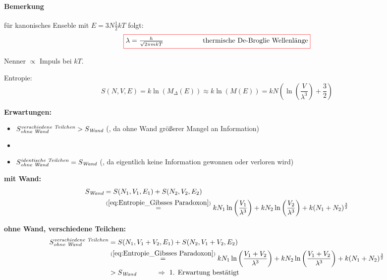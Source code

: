 \color{black!50!white}
\paragraph{Bemerkung} für kanonisches Enseble mit $E= 3N \frac{1}{2} k T$ folgt:
\begin{equation}
    \fcolorbox{red}{white}{$\lambda = \frac{h}{\sqrt{2 \pi mkT}} \hspace{2cm} \text{thermische De-Broglie Wellenlänge}$}
\end{equation}

Nenner $\propto $ Impuls bei $kT$.
\color{black}

Entropie:
\begin{equation}\label{eq:Entropie_Gibsses Paradoxon}
    S(N,V,E) = k \ln{(M_{\Delta}(E))} \approx k \ln{(M(E))} = kN \left( \ln \left( \frac{V}{\lambda^3}\right) + \frac{3}{2}\right)
\end{equation}


\textbf{Erwartungen:}
\begin{itemize}
    \item[] $S_{\footnotesize{\textit{ohne Wand}}}^{\footnotesize{\textit{verschiedene Teilchen}}} > S_{\footnotesize{\textit{Wand}}}$  (, da ohne Wand größerer Mangel an Information)
    \item[] 
    \item[] $S_{\footnotesize{\textit{ohne Wand}}}^{\footnotesize{\textit{identische Teilchen}}} = S_{\footnotesize{\textit{Wand}}}$ (, da eigentlich keine Information gewonnen oder verloren wird)
\end{itemize}


\textbf{mit Wand:}
\begin{align}
    S_{\footnotesize{\textit{Wand}}} &= S(N_1,V_1,E_1) + S(N_2,V_2,E_2) \\&\stackrel{(\ref{eq:Entropie_Gibsses Paradoxon})}{=} k N_1 \ln\left(\frac{V_1}{\lambda^3}\right) + k N_2 \ln\left(\frac{V_2}{\lambda^3}\right) +k (N_1+N_2)^\frac{3}{2}
\end{align}

\textbf{ohne Wand, verschiedene Teilchen:}
\begin{align}
    S_{\footnotesize{\textit{ohne Wand}}}^{\footnotesize{\textit{verschiedene Teilchen}}} &= S(N_1,V_1+V_2,E_1) + S(N_2,V_1+V_2,E_2) \\&\stackrel{(\ref{eq:Entropie_Gibsses Paradoxon})}{=} k N_1 \ln\left(\frac{V_1+V_2}{\lambda^3}\right) + k N_2 \ln\left(\frac{V_1+V_2}{\lambda^3}\right) +k (N_1+N_2)^\frac{3}{2}\\
    &> S_{\footnotesize{\textit{Wand}}} \hspace{1cm} \Rightarrow \ \text{1. Erwartung bestätigt}
\end{align}

